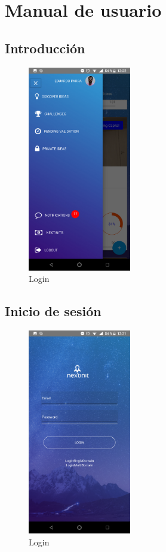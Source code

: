 \chapter{Manual de usuario}

\section{Introducción}

\begin{figure}[!h]
	\begin{center}
		\includegraphics[width=0.4\textwidth]{./img/anexo1/menu_admin.png}
		\caption{Login}
		\label{fig:menu_admin}
	\end{center}
\end{figure}

\section{Inicio de sesión}

\begin{figure}[!h]
	\begin{center}
		\includegraphics[width=0.4\textwidth]{./img/anexo1/login.png}
		\caption{Login}
		\label{fig:login}
	\end{center}
\end{figure}

